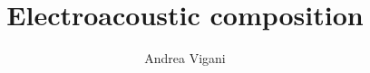 \documentclass[a4paper,11pt]{book}
\begin{document}
\author{Andrea Vigani}
\title{Electroacoustic composition}
\maketitle


\tableofcontents





\end{document}
